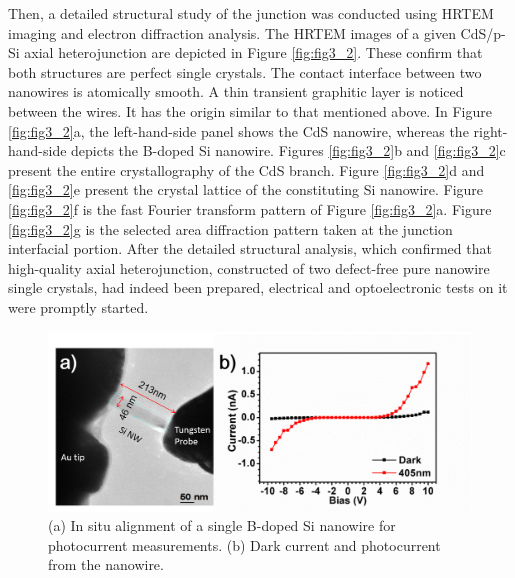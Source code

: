 Then, a detailed structural study of the junction was conducted using HRTEM imaging and electron diffraction analysis. The HRTEM images of a given CdS/p-Si axial heterojunction are depicted in Figure \ref{fig:fig3_2}. These confirm that both structures are perfect single crystals. The contact interface between two nanowires is atomically smooth. A thin transient graphitic layer is noticed between the wires. It has the origin similar to that mentioned above. In Figure \ref{fig:fig3_2}a, the left-hand-side panel shows the CdS nanowire, whereas the right-hand-side depicts the B-doped Si nanowire. Figures \ref{fig:fig3_2}b and \ref{fig:fig3_2}c present the entire crystallography of the CdS branch. Figure \ref{fig:fig3_2}d and \ref{fig:fig3_2}e present the crystal lattice of the constituting Si nanowire. Figure \ref{fig:fig3_2}f is the fast Fourier transform pattern of Figure \ref{fig:fig3_2}a. Figure \ref{fig:fig3_2}g is the selected area diffraction pattern taken at the junction interfacial portion. After the detailed structural analysis, which confirmed that high-quality axial heterojunction, constructed of two defect-free pure nanowire single crystals, had indeed been prepared, electrical and optoelectronic tests on it were promptly started. 

\begin{figure}  
\includegraphics[width=\textwidth]{figures/figure3_s2}
\caption[TEM and currents of a Si NW]{(a) In situ alignment of a single B-doped Si nanowire for photocurrent measurements. (b) Dark current and photocurrent from the nanowire. 
\label{fig:fig3_s2}}
\end{figure}

